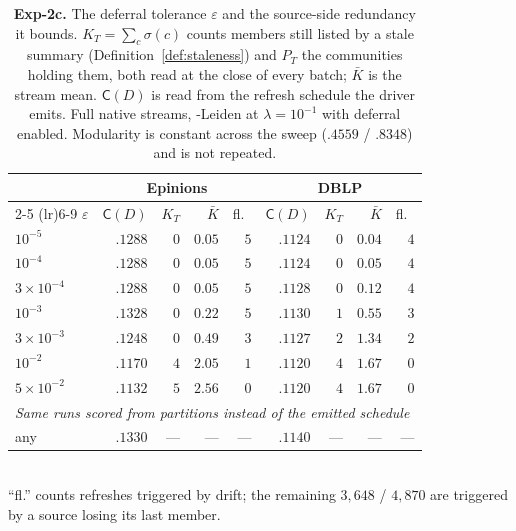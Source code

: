 \begin{table}[tb]\centering
\caption{\textbf{Exp-2c.} The deferral tolerance $\varepsilon$ and the source-side
redundancy it bounds. $K_T=\sum_c \sigma(c)$ counts members still listed by a
stale summary (Definition~\ref{def:staleness}) and $P_T$ the communities holding
them, both read at the close of every batch; $\bar K$ is the stream mean.
$\mathsf C(D)$ is read from the refresh schedule the driver emits. Full native
streams, \DyLo{}-Leiden at $\lambda=10^{-1}$ with deferral enabled. Modularity is
constant across the sweep ($.4559$ / $.8348$) and is not repeated.}
\label{tab:eps}
\begin{footnotesize}
\setlength{\tabcolsep}{0.34em}
\begin{tabular}{lrrrr rrrr}
\toprule
& \multicolumn{4}{c}{Epinions} & \multicolumn{4}{c}{DBLP} \\
\cmidrule(lr){2-5} \cmidrule(lr){6-9}
$\varepsilon$ & $\mathsf C(D)$ & $K_T$ & $\bar K$ & fl.\ & $\mathsf C(D)$ & $K_T$ & $\bar K$ & fl.\ \\
\midrule
$10^{-5}$          & $.1288$ & $0$ & $0.05$ & $5$ & $.1124$ & $0$ & $0.04$ & $4$ \\
$10^{-4}$          & $.1288$ & $0$ & $0.05$ & $5$ & $.1124$ & $0$ & $0.05$ & $4$ \\
$3\times10^{-4}$   & $.1288$ & $0$ & $0.05$ & $5$ & $.1128$ & $0$ & $0.12$ & $4$ \\
$10^{-3}$          & $.1328$ & $0$ & $0.22$ & $5$ & $.1130$ & $1$ & $0.55$ & $3$ \\
$3\times10^{-3}$   & $.1248$ & $0$ & $0.49$ & $3$ & $.1127$ & $2$ & $1.34$ & $2$ \\
$10^{-2}$          & $.1170$ & $4$ & $2.05$ & $1$ & $.1120$ & $4$ & $1.67$ & $0$ \\
$5\times10^{-2}$   & $.1132$ & $5$ & $2.56$ & $0$ & $.1120$ & $4$ & $1.67$ & $0$ \\
\midrule
\multicolumn{9}{l}{\emph{Same runs scored from partitions instead of the emitted schedule}} \\
any               & $.1330$ & --- & --- & --- & $.1140$ & --- & --- & --- \\
\bottomrule
\end{tabular}
\end{footnotesize}
\\[2pt]
{\footnotesize ``fl.'' counts refreshes triggered by drift; the remaining
$3{,}648$ / $4{,}870$ are triggered by a source losing its last member.}
\end{table}

